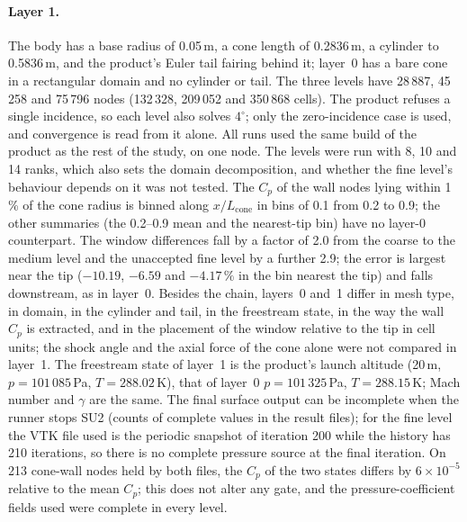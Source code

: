 \documentclass[twocolumn]{labreport}
\newcommand{\Cp}{C_p}
\begin{document}
\paragraph{Layer 1.}
The body has a base radius of 0.05\,m, a cone length of 0.2836\,m, a cylinder to 0.5836\,m, and the product's Euler tail fairing behind it; layer~0 has a bare cone in a rectangular domain and no cylinder or tail.
The three levels have 28\,887, 45\,258 and 75\,796 nodes (132\,328, 209\,052 and 350\,868 cells).
The product refuses a single incidence, so each level also solves $4^\circ$; only the zero-incidence case is used, and convergence is read from it alone.
All runs used the same build of the product as the rest of the study, on one node.
The levels were run with 8, 10 and 14 ranks, which also sets the domain decomposition, and whether the fine level's behaviour depends on it was not tested.
The $\Cp$ of the wall nodes lying within 1\,\% of the cone radius is binned along $x/L_\mathrm{cone}$ in bins of 0.1 from 0.2 to 0.9; the other summaries (the 0.2--0.9 mean and the nearest-tip bin) have no layer-0 counterpart.
The window differences fall by a factor of 2.0 from the coarse to the medium level and the unaccepted fine level by a further 2.9; the error is largest near the tip ($-10.19$, $-6.59$ and $-4.17\,\%$ in the bin nearest the tip) and falls downstream, as in layer~0.
Besides the chain, layers~0 and~1 differ in mesh type, in domain, in the cylinder and tail, in the freestream state, in the way the wall $\Cp$ is extracted, and in the placement of the window relative to the tip in cell units; the shock angle and the axial force of the cone alone were not compared in layer~1.
The freestream state of layer~1 is the product's launch altitude (20\,m, $p=101\,085$\,Pa, $T=288.02$\,K), that of layer~0 $p=101\,325$\,Pa, $T=288.15$\,K; Mach number and $\gamma$ are the same.
The final surface output can be incomplete when the runner stops SU2 (counts of complete values in the result files); for the fine level the VTK file used is the periodic snapshot of iteration 200 while the history has 210 iterations, so there is no complete pressure source at the final iteration.
On 213 cone-wall nodes held by both files, the $\Cp$ of the two states differs by $6\times10^{-5}$ relative to the mean $\Cp$; this does not alter any gate, and the pressure-coefficient fields used were complete in every level.
\end{document}
